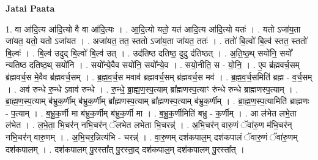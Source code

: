 \documentclass[17pt]{extarticle}
\begin{document}
\textbf{Jatai Paata} \newline

1. वा आ॑दि॒त्य आ॑दि॒त्यो वै वा आ॑दि॒त्यः । . आ॒दि॒त्यो यतो॒ यत॑ आदि॒त्य आ॑दि॒त्यो यतः॑ । . यतो ऽजा॑य॒ता जा॑यत॒ यतो॒ यतो ऽजा॑यत । . अजा॑यत॒ तत॒ स्ततो ऽजा॑य॒ता जा॑यत॒ ततः॑ । . ततो॑ बि॒ल्वो॑ बि॒ल्व॑ स्तत॒ स्ततो॑ बि॒ल्वः॑ । . बि॒ल्व॑ उदुद् बि॒ल्वो॑ बि॒ल्व॑ उत् । . उद॑तिष्ठ दतिष्ठ॒ दुदु द॑तिष्ठत् । . अ॒ति॒ष्ठ॒थ् सयो॑नि॒ सयो᳚ न्यतिष्ठ दतिष्ठ॒थ् सयो॑नि । . सयो᳚न्ये॒वैव सयो॑नि॒ सयो᳚न्ये॒व । . सयो॒नीति॒ स - यो॒नि॒ । . ए॒व ब्र॑ह्मवर्च॒सम् ब्र॑ह्मवर्च॒स मे॒वैव ब्र॑ह्मवर्च॒सम् । . ब्र॒ह्म॒व॒र्च॒स मवाव॑ ब्रह्मवर्च॒सम् ब्र॑ह्मवर्च॒स मव॑ । . ब्र॒ह्म॒व॒र्च॒समिति॑ ब्रह्म - व॒र्च॒सम् । . अव॑ रुन्धे रु॒न्धे ऽवाव॑ रुन्धे । . रु॒न्धे॒ ब्रा॒ह्म॒ण॒स्प॒त्याम् ब्रा᳚ह्मणस्प॒त्याꣳ रु॑न्धे रुन्धे ब्राह्मणस्प॒त्याम् । . ब्रा॒ह्म॒ण॒स्प॒त्याम् ब॑भ्रुक॒र्णीम् ब॑भ्रुक॒र्णीम् ब्रा᳚ह्मणस्प॒त्याम् ब्रा᳚ह्मणस्प॒त्याम् ब॑भ्रुक॒र्णीम् । . ब्रा॒ह्म॒ण॒स्प॒त्यामिति॑ ब्राह्मणः - प॒त्याम् । . ब॒भ्रु॒क॒र्णी मा ब॑भ्रुक॒र्णीम् ब॑भ्रुक॒र्णी मा । . ब॒भ्रु॒क॒र्णीमिति॑ बभ्रु - क॒र्णीम् । . आ ल॑भेत लभे॒ता ल॑भेत । . ल॒भे॒ता॒ भि॒चर॑न् नभि॒चर॑न् ॅलभेत लभेता भि॒चरन्न्॑ । . अ॒भि॒चर॑न् वारु॒णं ॅवा॑रु॒ण म॑भि॒चर॑न् नभि॒चर॑न् वारु॒णम् । . अ॒भि॒चर॒न्नित्य॑भि - चरन्न्॑ । . वा॒रु॒णम् दश॑कपाल॒म् दश॑कपालं ॅवारु॒णं ॅवा॑रु॒णम् दश॑कपालम् । . दश॑कपालम् पु॒रस्ता᳚त् पु॒रस्ता॒द् दश॑कपाल॒म् दश॑कपालम् पु॒रस्ता᳚त् । \newline
\end{document}
